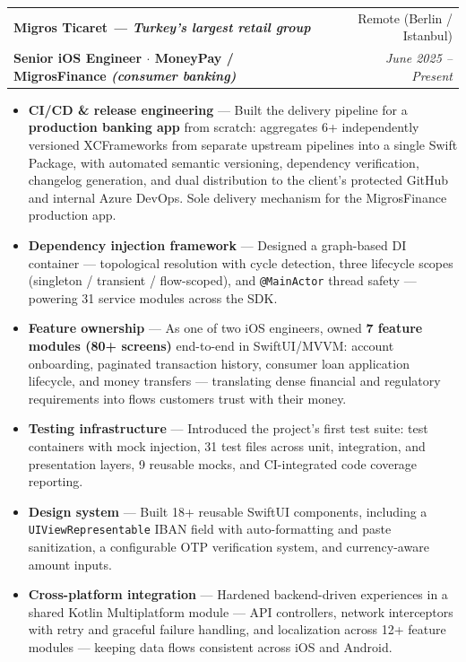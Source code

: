 \documentclass[a4paper,11pt]{article}
\makeatletter
\newcommand{\resumeItem}[2]{
  \item\small{
    \textbf{#1} --- #2\vspace{-2pt}
  }
}
\newcommand{\resumeSubheading}[4]{
  \vspace{2pt}\item
    \begin{tabular*}{0.97\textwidth}[t]{l@{\extracolsep{\fill}}r}
      \textbf{#1} & \small#2 \\
      \small\textbf{#3} & \textit{\small #4} \\
    \end{tabular*}\vspace{-5pt}
}
\newcommand{\resumeItemListStart}{\begin{itemize}}
\newcommand{\resumeItemListEnd}{\end{itemize}\vspace{-5pt}}
\makeatother
\begin{document}
    \resumeSubheading
      {Migros Ticaret \textnormal{\small\textit{--- Turkey's largest retail group}}}{Remote (Berlin / Istanbul)}
      {Senior iOS Engineer $\cdot$ MoneyPay / MigrosFinance \textnormal{\textit{(consumer banking)}}}{June 2025 -- Present}
      \resumeItemListStart
        \resumeItem{CI/CD \& release engineering}
          {Built the delivery pipeline for a \textbf{production banking app} from scratch: aggregates 6+ independently versioned XCFrameworks from separate upstream pipelines into a single Swift Package, with automated semantic versioning, dependency verification, changelog generation, and dual distribution to the client's protected GitHub and internal Azure DevOps. Sole delivery mechanism for the MigrosFinance production app.}
        \resumeItem{Dependency injection framework}
          {Designed a graph-based DI container --- topological resolution with cycle detection, three lifecycle scopes (singleton / transient / flow-scoped), and \texttt{@MainActor} thread safety --- powering 31 service modules across the SDK.}
        \resumeItem{Feature ownership}
          {As one of two iOS engineers, owned \textbf{7 feature modules (80+ screens)} end-to-end in SwiftUI/MVVM: account onboarding, paginated transaction history, consumer loan application lifecycle, and money transfers --- translating dense financial and regulatory requirements into flows customers trust with their money.}
        \resumeItem{Testing infrastructure}
          {Introduced the project's first test suite: test containers with mock injection, 31 test files across unit, integration, and presentation layers, 9 reusable mocks, and CI-integrated code coverage reporting.}
        \resumeItem{Design system}
          {Built 18+ reusable SwiftUI components, including a \texttt{UIViewRepresentable} IBAN field with auto-formatting and paste sanitization, a configurable OTP verification system, and currency-aware amount inputs.}
        \resumeItem{Cross-platform integration}
          {Hardened backend-driven experiences in a shared Kotlin Multiplatform module --- API controllers, network interceptors with retry and graceful failure handling, and localization across 12+ feature modules --- keeping data flows consistent across iOS and Android.}
      \resumeItemListEnd
 
\end{document}
